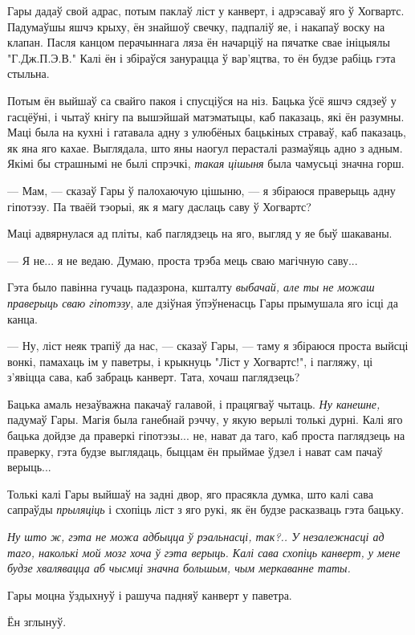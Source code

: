 Гары дадаў свой адрас, потым паклаў ліст у канверт, і адрэсаваў яго ў Хогвартс. Падумаўшы
яшчэ крыху, ён знайшоў свечку, падпаліў яе, і накапаў воску на клапан. Пасля канцом
перачыннага ляза ён начарціў на пячатке свае ініцыялы "Г.Дж.П.Э.В." Калі ён і збіраўся 
занурацца ў вар'яцтва, то ён будзе рабіць гэта стыльна.

Потым ён выйшаў са свайго пакоя і спусціўся на ніз. Бацька ўсё яшчэ сядзеў у гасцёўні, і чытаў
кнігу па вышэйшай матэматыцы, каб паказаць, які ён разумны. Маці была на кухні і гатавала
адну з улюбёных бацькіных страваў, каб паказаць, як яна яго кахае. Выглядала, што яны наогул
перасталі размаўяць адно з адным. Якімі бы страшнымі не былі спрэчкі, \emph{такая цішыня} была
чамусьці значна горш.

--- Мам, --- сказаў Гары ў палохаючую цішыню, --- я збіраюся праверыць адну гіпотэзу. Па тваёй
тэорыі, як я магу даслаць саву ў Хогвартс?

Маці адвярнулася ад пліты, каб паглядзець на яго, выгляд у яе быў шакаваны. 

--- Я не... я не ведаю. Думаю, проста трэба мець сваю магічную саву...

Гэта было павінна гучаць падазрона, кшталту \emph{выбачай, але ты не можаш праверыць сваю гіпотэзу}, 
але дзіўная ўпэўненасць Гары прымушала яго ісці да канца.

--- Ну, ліст неяк трапіў да нас, --- сказаў Гары, --- таму я збіраюся проста выйсці вонкі, 
памахаць ім у паветры, і крыкнуць "Ліст у Хогвартс!", і пагляжу, ці з'явіцца сава, каб забраць
канверт. Тата, хочаш паглядзець?

Бацька амаль незаўважна пакачаў галавой, і працягваў чытаць. \emph{Ну канешне,} падумаў Гары.
Магія была ганебнай рэччу, у якую верылі толькі дурні. Калі яго бацька дойдзе да праверкі
гіпотэзы... не, нават да таго, каб проста паглядзець на праверку, гэта будзе выглядаць, 
быццам ён прыймае ўдзел і нават сам пачаў верыць...

Толькі калі Гары выйшаў на задні двор, яго прасякла думка, што калі сава сапраўды \emph{прыляціць} і
схопіць ліст з яго рукі, як ён будзе расказваць гэта бацьку.

\emph{Ну што ж, гэта не можа адбыцца ў рэальнасці, так?.. У незалежнасці ад таго, наколькі
мой мозг хоча ў гэта верыць. Калі сава схопіць канверт, у мене будзе хвалявацца аб чысмці 
значна большым, чым меркаванне таты.}

Гары моцна ўздыхнуў і рашуча падняў канверт у паветра.

Ён зглынуў.

